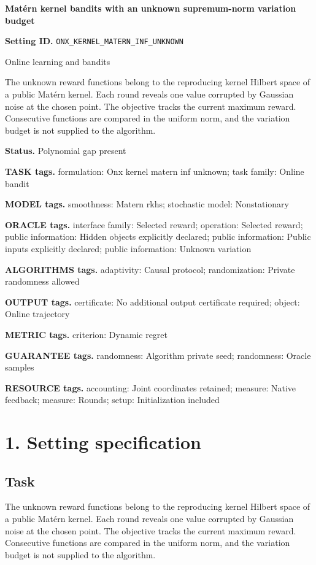 \documentclass[10pt,a4paper]{article}
\begin{document}
\raggedright

{\LARGE\bfseries\sffamily\color{AtlasNavy} Matérn kernel bandits with an unknown supremum-norm variation budget\par}\vspace{5pt}
\textbf{Setting ID.} \texttt{ONX\_\allowbreak{}KERNEL\_\allowbreak{}MATERN\_\allowbreak{}INF\_\allowbreak{}UNKNOWN}

Online learning and bandits

The unknown reward functions belong to the reproducing kernel Hilbert space of a public Matérn kernel. Each round reveals one value corrupted by Gaussian noise at the chosen point. The objective tracks the current maximum reward. Consecutive functions are compared in the uniform norm, and the variation budget is not supplied to the algorithm.

\textbf{Status.} Polynomial gap present

\textbf{TASK tags.} formulation: Onx kernel matern inf unknown; task family: Online bandit

\textbf{MODEL tags.} smoothness: Matern rkhs; stochastic model: Nonstationary

\textbf{ORACLE tags.} interface family: Selected reward; operation: Selected reward; public information: Hidden objects explicitly declared; public information: Public inputs explicitly declared; public information: Unknown variation

\textbf{ALGORITHMS tags.} adaptivity: Causal protocol; randomization: Private randomness allowed

\textbf{OUTPUT tags.} certificate: No additional output certificate required; object: Online trajectory

\textbf{METRIC tags.} criterion: Dynamic regret

\textbf{GUARANTEE tags.} randomness: Algorithm private seed; randomness: Oracle samples

\textbf{RESOURCE tags.} accounting: Joint coordinates retained; measure: Native feedback; measure: Rounds; setup: Initialization included

\section{1. Setting specification}
\subsection{Task}
The unknown reward functions belong to the reproducing kernel Hilbert space of a public Matérn kernel. Each round reveals one value corrupted by Gaussian noise at the chosen point. The objective tracks the current maximum reward. Consecutive functions are compared in the uniform norm, and the variation budget is not supplied to the algorithm.
\end{document}
